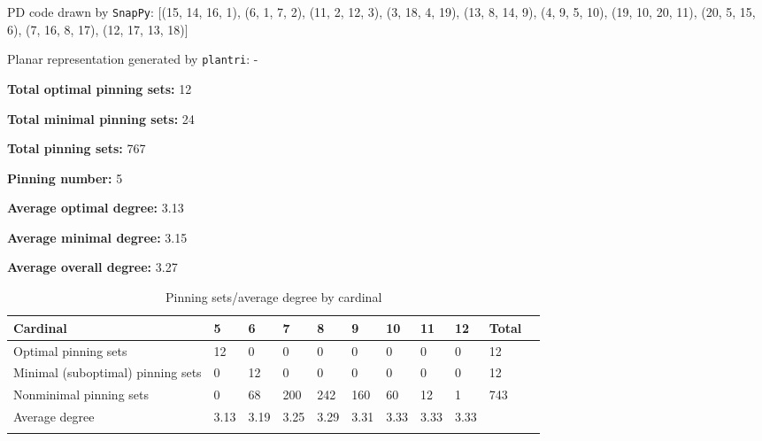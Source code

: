\documentclass{article}%
\begin{document}
{\small\noindent PD code drawn by \texttt{SnapPy}: [(15, 14, 16, 1), (6, 1, 7, 2), (11, 2, 12, 3), (3, 18, 4, 19), (13, 8, 14, 9), (4, 9, 5, 10), (19, 10, 20, 11), (20, 5, 15, 6), (7, 16, 8, 17), (12, 17, 13, 18)]}

{\small\noindent Planar representation generated by \texttt{plantri}: -}

\begin{multicols}{2}
{\normalsize \noindent\textbf{Total optimal pinning sets:} 12

\noindent\textbf{Total minimal pinning sets:} 24

\noindent\textbf{Total pinning sets:} 767

\noindent\textbf{Pinning number:} 5

}
\columnbreak

{\normalsize \noindent\textbf{Average optimal degree:} 3.13

\noindent\textbf{Average minimal degree:} 3.15

\noindent\textbf{Average overall degree:} 3.27

}
\end{multicols}

\begin{table}[ht]
	\caption{Pinning sets/average degree by cardinal}
	\centering
	\renewcommand{\arraystretch}{1.5}
	\begin{tabularx}{\textwidth}{lXXXXXXXXXX}
		\toprule
			Cardinal & 5 & 6 & 7 & 8 & 9 & 10 & 11 & 12 & Total\\
			\hline
			Optimal pinning sets & 12 & 0 & 0 & 0 & 0 & 0 & 0 & 0 & 12 \\
			Minimal (suboptimal) pinning sets & 0 & 12 & 0 & 0 & 0 & 0 & 0 & 0 & 12 \\
			Nonminimal pinning sets & 0 & 68 & 200 & 242 & 160 & 60 & 12 & 1 & 743 \\
			Average degree & 3.13 & 3.19 & 3.25 & 3.29 & 3.31 & 3.33 & 3.33 & 3.33 &  \\
		\bottomrule \\ 
	\end{tabularx}
\end{table}
\end{document}
